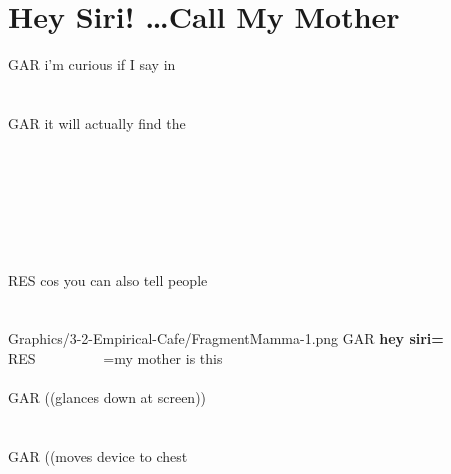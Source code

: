 



\section{Hey Siri! \ldots Call My Mother}\label{app:fragments-cafe mama}
\begin{inlinefrag*} 
    \begin{transcript*}
        \by GAR {i'm curious if I say in} \\
         \\
         \\
        \by GAR {it will actually find the } \\
         \\
         \\
         \\
         \\
         \\
         \\
         \\
        \by RES {cos you can also tell people} \\
         \\
         \\
           {Graphics/3-2-Empirical-Cafe/FragmentMamma-1.png}
        \by GAR {\textbf{hey siri=}} \\
        \by RES {~~~~~~~~~=my mother is this} \\
         \\
        \by GAR {((glances down at screen))} \\
         \\
         \\
        \by GAR {((moves device to chest} \\

\end{transcript*}
\end{inlinefrag*}

